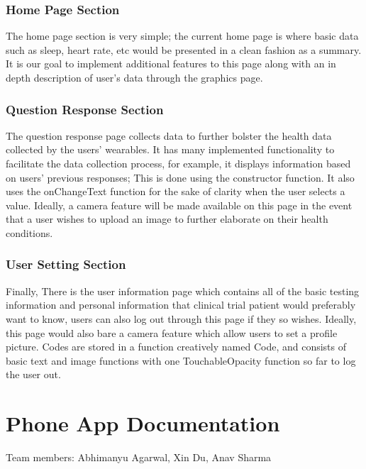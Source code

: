 \documentclass[]{book}
\begin{document}
\subsection{Home Page Section}\label{home-page-section}

The home page section is very simple; the current home page is where
basic data such as sleep, heart rate, etc would be presented in a clean
fashion as a summary. It is our goal to implement additional features to
this page along with an in depth description of user's data through the
graphics page.

\subsection{Question Response Section}\label{question-response-section}

The question response page collects data to further bolster the health
data collected by the users' wearables. It has many implemented
functionality to facilitate the data collection process, for example, it
displays information based on users' previous responses; This is done
using the constructor function. It also uses the onChangeText function
for the sake of clarity when the user selects a value. Ideally, a camera
feature will be made available on this page in the event that a user
wishes to upload an image to further elaborate on their health
conditions.

\subsection{User Setting Section}\label{user-setting-section}

Finally, There is the user information page which contains all of the
basic testing information and personal information that clinical trial
patient would preferably want to know, users can also log out through
this page if they so wishes. Ideally, this page would also bare a camera
feature which allow users to set a profile picture. Codes are stored in
a function creatively named Code, and consists of basic text and image
functions with one TouchableOpacity function so far to log the user out.

\chapter{Phone App Documentation}\label{phone-app-documentation}

Team members: Abhimanyu Agarwal, Xin Du, Anav Sharma
\end{document}
